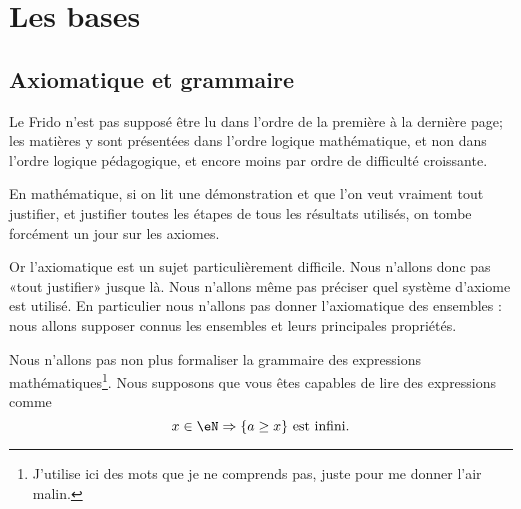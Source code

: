 
\section{Les bases}
\label{SECooIntroBases}

\subsection{Axiomatique et grammaire}
\label{SUBooTheorieEnsembles}
\begin{normaltext}\label{NorooFridoIntro1}
	Le Frido n'est pas supposé être lu dans l'ordre de la première à la dernière page; les matières y sont présentées dans l'ordre logique mathématique, et non dans l'ordre logique pédagogique, et encore moins par ordre de difficulté croissante.

	En mathématique, si on lit une démonstration et que l'on veut vraiment tout justifier, et justifier toutes les étapes de tous les résultats utilisés, on tombe forcément un jour sur les axiomes.

	Or l'axiomatique est un sujet particulièrement difficile. Nous n'allons donc pas «tout justifier» jusque là. Nous n'allons même pas préciser quel système d'axiome est utilisé. En particulier nous n'allons pas donner l'axiomatique des ensembles : nous allons supposer connus les ensembles et leurs principales propriétés.
\end{normaltext}

\begin{normaltext}\label{NorooFridoGrammaire}
	Nous n'allons pas non plus formaliser la grammaire des expressions mathématiques\footnote{J'utilise ici des mots que je ne comprends pas, juste pour me donner l'air malin.}. Nous supposons que vous êtes capables de lire des expressions comme
	\begin{equation}
		x\in \eN\Rightarrow\{ a\geq x \}\text{ est infini}.
	\end{equation}
\end{normaltext}

